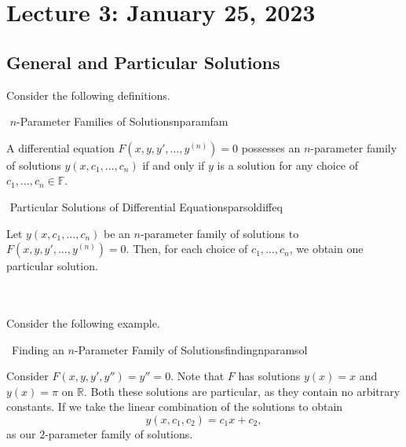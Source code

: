 \pagebreak

\section{Lecture 3: January 25, 2023}

    \subsection{General and Particular Solutions}
    
        Consider the following definitions.
        \begin{definition}{\Stop\,\,\(n\)-Parameter Families of Solutions}{nparamfam}

            A differential equation \(F(x,y,y',\ldots,y^{(n)})=0\) possesses an \(n\)-parameter family of solutions \(y(x,c_1,\ldots,c_n)\) if and only if \(y\) is a solution for any choice of \(c_1,\ldots,c_n\in\mathbb{F}\).
            
        \end{definition}
        \begin{definition}{\Stop\,\,Particular Solutions of Differential Equations}{parsoldiffeq}

            Let \(y(x,c_1,\ldots,c_n)\) be an \(n\)-parameter family of solutions to \(F(x,y,y',\ldots,y^{(n)})=0\). Then, for each choice of \(c_1,\ldots,c_n\), we obtain one particular solution.
            
        \end{definition}
        \vphantom
        \\
        \\
        Consider the following example.
        \begin{example}{\Difficulty\,\Difficulty\,\,Finding an \(n\)-Parameter Family of Solutions}{findingnparamsol}

            Consider \(F(x,y,y',y'')=y''=0\). Note that \(F\) has solutions \(y(x)=x\) and \(y(x)=\pi\) on \(\mathbb{R}\). Both these solutions are particular, as they contain no arbitrary constants. If we take the linear combination of the solutions to obtain
            \begin{equation*}
                y(x,c_1,c_2)=c_1x+c_2,
            \end{equation*}
            as our \(2\)-parameter family of solutions.
            
        \end{example}
        \vphantom
        \\
